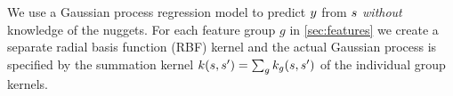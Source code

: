 We use a Gaussian process regression model \citep{rasmussen2004gaussian}
to predict $y$ from $s$ 
\emph{without} knowledge of the nuggets. 
For each feature group $g$ in \autoref{sec:features} we create a separate
radial basis function (RBF) kernel  and the 
 actual Gaussian process is specified by 
the summation kernel 
$k(s, s^\prime) = \sum_g k_g(s, s^\prime)$
of the individual group kernels.







